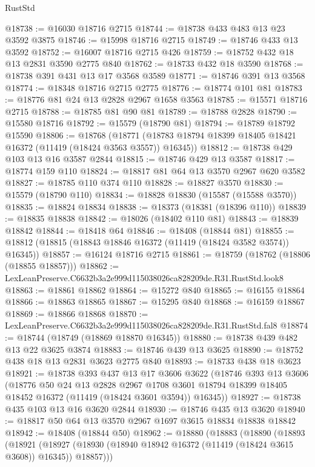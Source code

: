 \begin{lexlean}{RustStd}
\begin{coremodule}
@18738 := @16030 @18716 @2715
@18744 := @18738 @433 @483 @13 @23 @3592 @3875
@18746 := @15998 @18716 @2715
@18749 := @18746 @433 @13 @3592
@18752 := @16007 @18716 @2715 @426
@18759 := @18752 @432 @18 @13 @2831 @3590 @2775 @840
@18762 := @18733 @432 @18 @3590
@18768 := @18738 @391 @431 @13 @17 @3568 @3589
@18771 := @18746 @391 @13 @3568
@18774 := @18348 @18716 @2715 @2775
@18776 := @18774 @101 @81
@18783 := @18776 @81 @24 @13 @2828 @2967 @1658 @3563
@18785 := @15571 @18716 @2715
@18788 := @18785 @81 @90 @81
@18789 := @18788 @2828
@18790 := @15580 @18716
@18792 := @15579 (@18790 @81)
@18794 := @18789 @18792 @15590
@18806 := @18768
    (@18771 (@18783 @18794 @18399 @18405 @18421 @16372 (@11419 (@18424 @3563 @3557)) @16345))
@18812 := @18738 @429 @103 @13 @16 @3587 @2844
@18815 := @18746 @429 @13 @3587
@18817 := @18774 @159 @110
@18824 := @18817 @81 @64 @13 @3570 @2967 @620 @3582
@18827 := @18785 @110 @374 @110
@18828 := @18827 @3570
@18830 := @15579 (@18790 @110)
@18834 := @18828 @18830 (@15587 (@15588 @3570))
@18835 := @18824 @18834
@18838 := @18373 (@18381 (@18396 @110))
@18839 := @18835 @18838
@18842 := @18026 (@18402 @110 @81)
@18843 := @18839 @18842
@18844 := @18418 @64
@18846 := @18408 (@18844 @81)
@18855 := @18812 (@18815 (@18843 @18846 @16372 (@11419 (@18424 @3582 @3574)) @16345))
@18857 := @16124 @18716 @2715
@18861 := @18759 (@18762 (@18806 (@18855 @18857)))
@18862 := LexLeanPreserve.C6632b3a2e999d115038026ca828209de.R31.RustStd.look8
@18863 := @18861 @18862
@18864 := @15272 @840
@18865 := @16155 @18864
@18866 := @18863 @18865
@18867 := @15295 @840
@18868 := @16159 @18867
@18869 := @18866 @18868
@18870 := LexLeanPreserve.C6632b3a2e999d115038026ca828209de.R31.RustStd.fal8
@18874 := @18744 (@18749 (@18869 @18870 @16345))
@18880 := @18738 @439 @482 @13 @22 @3625 @3874
@18883 := @18746 @439 @13 @3625
@18890 := @18752 @438 @18 @13 @2831 @3623 @2775 @840
@18893 := @18733 @438 @18 @3623
@18921 := @18738
    @393
    @437
    @13
    @17
    @3606
    @3622
    (@18746
      @393
      @13
      @3606
      (@18776
        @50
        @24
        @13
        @2828
        @2967
        @1708
        @3601
        @18794
        @18399
        @18405
        @18452
        @16372
        (@11419 (@18424 @3601 @3594))
        @16345))
@18927 := @18738 @435 @103 @13 @16 @3620 @2844
@18930 := @18746 @435 @13 @3620
@18940 := @18817 @50 @64 @13 @3570 @2967 @1697 @3615 @18834 @18838 @18842
@18942 := @18408 (@18844 @50)
@18962 := @18880
    (@18883
      (@18890
        (@18893
          (@18921
            (@18927 (@18930 (@18940 @18942 @16372 (@11419 (@18424 @3615 @3608)) @16345)) @18857)))

\end{coremodule}
\end{lexlean}
